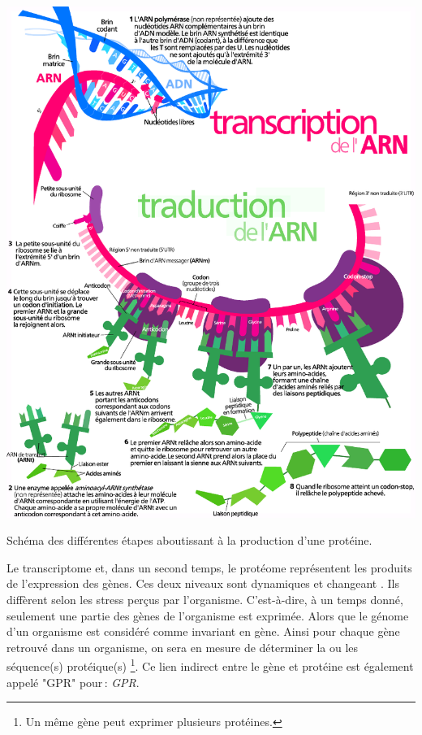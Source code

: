 \begin{refsegment}
    \begin{shadedfigure}[H]
        \centering
        \includegraphics[width=\textwidth]{img/production_proteine2.pdf}
        \caption{Schéma des différentes étapes aboutissant à la production d’une protéine.}
        \label{fig:production_proteine}
    \end{shadedfigure}
    
    Le transcriptome et, dans un second temps, le protéome représentent les produits de l'expression des gènes. Ces deux niveaux sont dynamiques et changeant . Ils diffèrent selon les stress perçus par l'organisme. C'est-à-dire, à un temps donné, seulement une partie des gènes de l'organisme est exprimée. Alors que le génome d'un organisme est considéré comme invariant en gène. Ainsi pour chaque gène retrouvé dans un organisme, on sera en mesure de déterminer la ou les séquence(s) protéique(s) \footnote{Un même gène peut exprimer plusieurs protéines.}. Ce lien indirect entre le gène et protéine est également appelé "\acrshort{GPR}" pour : \textit{\acrfull{GPR}}.
    

\end{refsegment}
